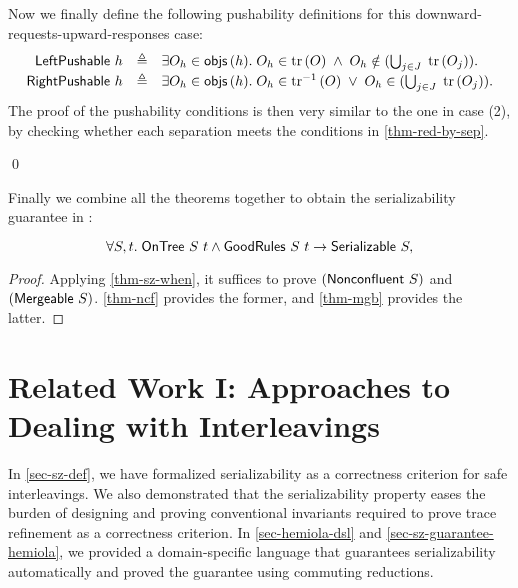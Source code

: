 Now we finally define the following pushability definitions for this downward-requests-upward-responses case:
\begin{displaymath}
  \renewcommand{\arraystretch}{1.2}
  \begin{array}{rcl}
    \mathsf{LeftPushable}\ h & \triangleq & \exists O_h \in \aobjs{h}.\; O_h \in \subtree{O} \;\wedge\; O_h \notin (\bigcup_{j \in J}\; \subtree{O_j}).\\
    \mathsf{RightPushable}\ h & \triangleq & \exists O_h \in \aobjs{h}.\; O_h \in \subtreec{O} \;\vee\; O_h \in (\bigcup_{j \in J}\; \subtree{O_j}).
  \end{array}
\end{displaymath}
The proof of the pushability conditions is then very similar to the one in case (2), by checking whether each separation meets the conditions in \autoref{thm-red-by-sep}.

\renewcommand\qedsymbol{${\color{mygray}\textit{(End of the mergeability proof)}}\ \blacksquare$}
\qed{}
\renewcommand\qedsymbol{$\blacksquare$}

Finally we combine all the theorems together to obtain the serializability guarantee in \hemiola{}:
\begin{theorem}
  \begin{displaymath}
    \forall S, t.\; \mathsf{OnTree}\ S\ t \land \mathsf{GoodRules}\ S\ t \to \mathsf{Serializable}\ S,
  \end{displaymath}
  \vspace{-15pt}
  \label{thm-sz-guarantee}
\end{theorem}
\begin{proof}
  Applying \autoref{thm-sz-when}, it suffices to prove $(\mathsf{Nonconfluent}\ S)$ and $(\mathsf{Mergeable}\ S)$.
  \autoref{thm-ncf} provides the former, and \autoref{thm-mgb} provides the latter.
\end{proof}

\chapter{Related Work I: Approaches to Dealing with Interleavings}
\label{sec-related-work-i}

In \autoref{sec-sz-def}, we have formalized serializability as a correctness criterion for safe interleavings.
We also demonstrated that the serializability property eases the burden of designing and proving conventional invariants required to prove trace refinement as a correctness criterion.
In \autoref{sec-hemiola-dsl} and \autoref{sec-sz-guarantee-hemiola}, we provided a domain-specific language that guarantees serializability automatically and proved the guarantee using commuting reductions.

